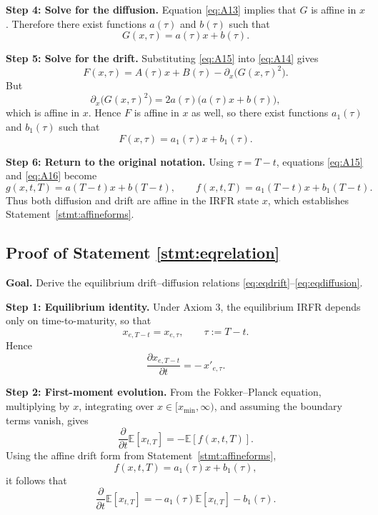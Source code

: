 \documentclass[12pt]{article}
\theoremstyle{statementstyle}
\begin{document}
\begin{appendices}
\medskip
\noindent\textbf{Step 4: Solve for the diffusion.}  
Equation \eqref{eq:A13} implies that \(G\) is affine in \(x\). Therefore
there exist functions \(a(\tau)\) and \(b(\tau)\) such that
\begin{equation}
G(x,\tau)=a(\tau)x+b(\tau).
\tag{A.1.5}\label{eq:A15}
\end{equation}

\medskip
\noindent\textbf{Step 5: Solve for the drift.}  
Substituting \eqref{eq:A15} into \eqref{eq:A14} gives
\[
F(x,\tau)
=
A(\tau)x+B(\tau)-\partial_x\!\bigl(G(x,\tau)^2\bigr).
\]
But
\[
\partial_x\!\bigl(G(x,\tau)^2\bigr)
=
2a(\tau)\bigl(a(\tau)x+b(\tau)\bigr),
\]
which is affine in \(x\). Hence \(F\) is affine in \(x\) as well, so there
exist functions \(a_1(\tau)\) and \(b_1(\tau)\) such that
\begin{equation}
F(x,\tau)=a_1(\tau)x+b_1(\tau).
\tag{A.1.6}\label{eq:A16}
\end{equation}

\medskip
\noindent\textbf{Step 6: Return to the original notation.}  
Using \(\tau=T-t\), equations \eqref{eq:A15} and \eqref{eq:A16} become
\[
g(x,t,T)=a(T-t)x+b(T-t),
\qquad
f(x,t,T)=a_1(T-t)x+b_1(T-t).
\]
Thus both diffusion and drift are affine in the IRFR state \(x\), which
establishes Statement~\ref{stmt:affineforms}.
\subsection{Proof of Statement \ref{stmt:eqrelation}}
\label{appendix:A2}

\textbf{Goal.}  
Derive the equilibrium drift--diffusion relations
\eqref{eq:eqdrift}--\eqref{eq:eqdiffusion}.

\medskip
\noindent\textbf{Step 1: Equilibrium identity.}  
Under Axiom 3, the equilibrium IRFR depends only on time-to-maturity, so that
\[
x_{e,T-t}=x_{e,\tau}, \qquad \tau:=T-t.
\]
Hence
\[
\frac{\partial x_{e,T-t}}{\partial t}
=
-\,x'_{e,\tau}.
\tag{A.2.12}
\]

\medskip
\noindent\textbf{Step 2: First-moment evolution.}  
From the Fokker--Planck equation, multiplying by \(x\), integrating over
\(x\in[x_{\min},\infty)\), and assuming the boundary terms vanish, gives
\[
\frac{\partial}{\partial t}\mathbb{E}[x_{t,T}]
=
-\mathbb{E}[f(x,t,T)].
\tag{A.2.13}
\]
Using the affine drift form from Statement~\ref{stmt:affineforms},
\[
f(x,t,T)=a_1(\tau)x+b_1(\tau),
\tag{A.2.14}\label{eq:A214}
\]
it follows that
\[
\frac{\partial}{\partial t}\mathbb{E}[x_{t,T}]
=
-\,a_1(\tau)\mathbb{E}[x_{t,T}] - b_1(\tau).
\tag{A.2.15}\label{eq:A215}
\]


\end{appendices}
\end{document}
